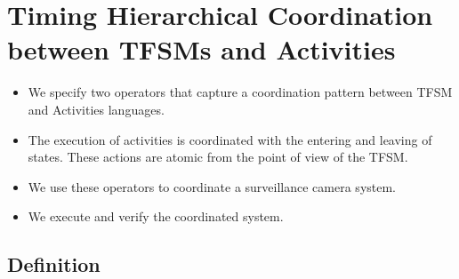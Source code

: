 \section{Timing Hierarchical Coordination between TFSMs and Activities}
	\begin{itemize}
		
		\item We specify two operators that capture a coordination pattern between TFSM and Activities languages. 
		\item The execution of activities is coordinated with the entering and leaving of states. These actions are atomic from the point of view of the TFSM. 
		\item We use these operators to coordinate a surveillance camera system.
		\item We execute and verify the coordinated system.

	\end{itemize}
	
	
	\subsection{Definition}
	
